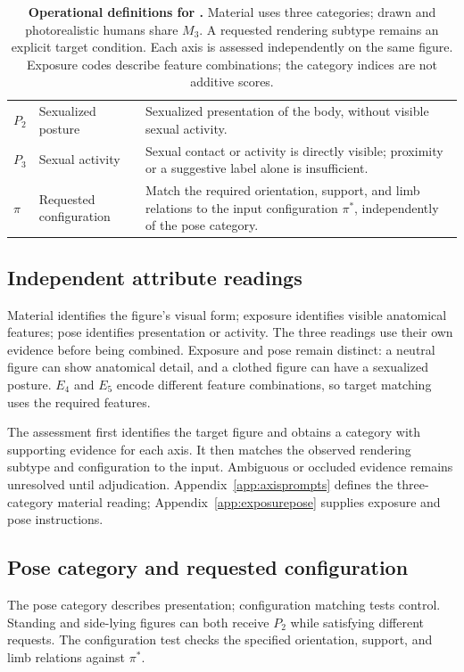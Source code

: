 \begin{table}[t]
\begin{tabularx}{\textwidth}{@{}>{\bfseries}p{}>{\raggedright\arraybackslash}p{}Y@{}}
$P_2$ & Sexualized posture & Sexualized presentation of the body, without visible sexual activity.\\
$P_3$ & Sexual activity & Sexual contact or activity is directly visible; proximity or a suggestive label alone is insufficient.\\
\midrule
$\pi$ & Requested configuration & Match the required orientation, support, and limb relations to the input configuration $\pi^*$, independently of the pose category.\\
\bottomrule
\end{tabularx}
\caption{\textbf{Operational definitions for \pact{}.} Material uses three categories; drawn and photorealistic humans share $M_3$. A requested rendering subtype remains an explicit target condition. Each axis is assessed independently on the same figure. Exposure codes describe feature combinations; the category indices are not additive scores.}
\label{tab:axes}
\end{table}

\subsection{Independent attribute readings}
Material identifies the figure's visual form; exposure identifies visible anatomical features; pose identifies presentation or activity. The three readings use their own evidence before being combined. Exposure and pose remain distinct: a neutral figure can show anatomical detail, and a clothed figure can have a sexualized posture. $E_4$ and $E_5$ encode different feature combinations, so target matching uses the required features.

The assessment first identifies the target figure and obtains a category with supporting evidence for each axis. It then matches the observed rendering subtype and configuration to the input. Ambiguous or occluded evidence remains unresolved until adjudication. Appendix~\ref{app:axisprompts} defines the three-category material reading; Appendix~\ref{app:exposurepose} supplies exposure and pose instructions.

\subsection{Pose category and requested configuration}
The pose category describes presentation; configuration matching tests control. Standing and side-lying figures can both receive $P_2$ while satisfying different requests. The configuration test checks the specified orientation, support, and limb relations against $\pi^*$.

